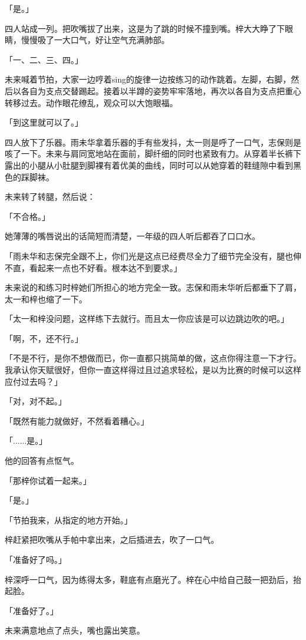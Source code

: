 \documentclass[UTF8]{ctexart}
\begin{document}
    「是。」

    四人站成一列。把吹嘴拔了出来，这是为了跳的时候不撞到嘴。梓大大睁了下眼睛，慢慢吸了一大口气，好让空气充满肺部。

    「一、二、三、四。」

    未来喊着节拍，大家一边哼着sing的旋律一边按练习的动作跳着。左脚，右脚，然后以各自为支点交替踢起。接着以半蹲的姿势牢牢落地，再次以各自为支点把重心转移过去。动作眼花缭乱，观众可以大饱眼福。

    「到这里就可以了。」

    四人放下了乐器。雨未华拿着乐器的手有些发抖，太一则是呼了一口气，志保则是咳了一下。未来与肩同宽地站在面前，脚纤细的同时也紧致有力。从穿着半长裤下露出的小腿从小肚腿到脚裸有着优美的曲线，同时可以从她穿着的鞋缝隙中看到黑色的踩脚袜。

    未来转了转腿，然后说：

    「不合格。」

    她薄薄的嘴唇说出的话简短而清楚，一年级的四人听后都吞了口口水。

    「雨未华和志保完全跟不上，你们光是这点已经费尽全力了细节完全没有，腿也伸不直，看起来一点也不好看。根本达不到要求。」

    未来说的和练习时梓她们所担心的地方完全一致。志保和雨未华听后都垂下了肩，太一和梓也缩了一下。

    「太一和梓没问题，这样练下去就行。而且太一你应该是可以边跳边吹的吧。」

    「啊，不，还不行。」

    「不是不行，是你不想做而已，你一直都只挑简单的做，这点你得注意一下才行。我承认你天赋很好，但你一直这样得过且过追求轻松，是以为比赛的时候可以这样应付过去吗？」

    「对，对不起。」

    「既然有能力就做好，不然看着糟心。」

    「......是。」

    他的回答有点怄气。

    「那梓你试着一起来。」

    「是。」

    「节拍我来，从指定的地方开始。」

    梓赶紧把吹嘴从手帕中拿出来，之后插进去，吹了一口气。

    「准备好了吗。」

    梓深呼一口气，因为练得太多，鞋底有点磨光了。梓在心中给自己鼓一把劲后，抬起脸。

    「准备好了。」

    未来满意地点了点头，嘴也露出笑意。
\end{document}
